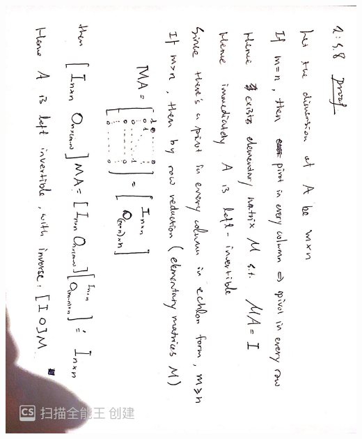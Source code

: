 \documentclass[]{book}
\theoremstyle{definition}
\newcommand{\0}{\mathbf{0}}
\begin{document}
\begin{enumerate}[label=\arabic*\degree]
\includegraphics[scale=0.15, angle=90]{images/8.jpg}


\end{enumerate}
\end{document}
